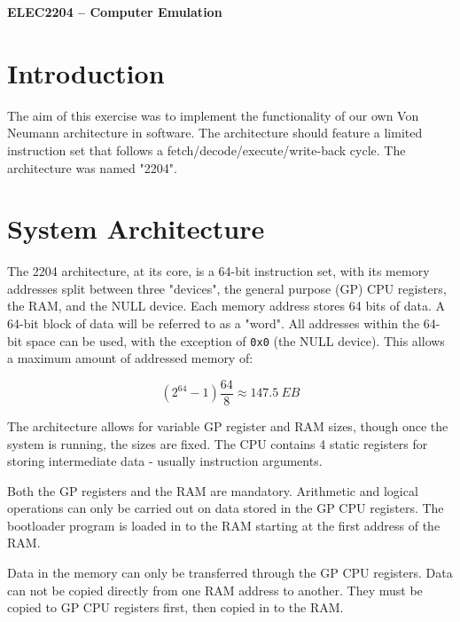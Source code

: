 \documentclass[a4paper,11pt]{article}
\begin{document}
  
\begin{center}
{\Large{\textbf{ELEC2204 -- Computer Emulation}}} \\ [\baselineskip]

\end{center}

\begin{abstract}

\end{abstract}

\section{Introduction}
    The aim of this exercise was to implement the functionality of our own Von Neumann architecture in software. The architecture should feature a limited instruction set that follows a fetch/decode/execute/write-back cycle. The architecture was named "2204".

\section{System Architecture}
    The 2204 architecture, at its core, is a 64-bit instruction set, with its memory addresses split between three "devices", the general purpose (GP) CPU registers, the RAM, and the NULL device. Each memory address stores 64 bits of data. A 64-bit block of data will be referred to as a "word". All addresses within the 64-bit space can be used, with the exception of \lstinline{0x0} (the NULL device). This allows a maximum amount of addressed memory of:
    
    \begin{displaymath}
        \left(2^{64} - 1\right) \frac{64}{8} \approx \SI{147.5}{EB}
    \end{displaymath}
    
    The architecture allows for variable GP register and RAM sizes, though once the system is running, the sizes are fixed. The CPU contains 4 static registers for storing intermediate data - usually instruction arguments.
    
    Both the GP registers and the RAM are mandatory. Arithmetic and logical operations can only be carried out on data stored in the GP CPU registers. The bootloader program is loaded in to the RAM starting at the first address of the RAM.
    
    Data in the memory can only be transferred through the GP CPU registers. Data can not be copied directly from one RAM address to another. They must be copied to GP CPU registers first, then copied in to the RAM.
    
\end{document}
